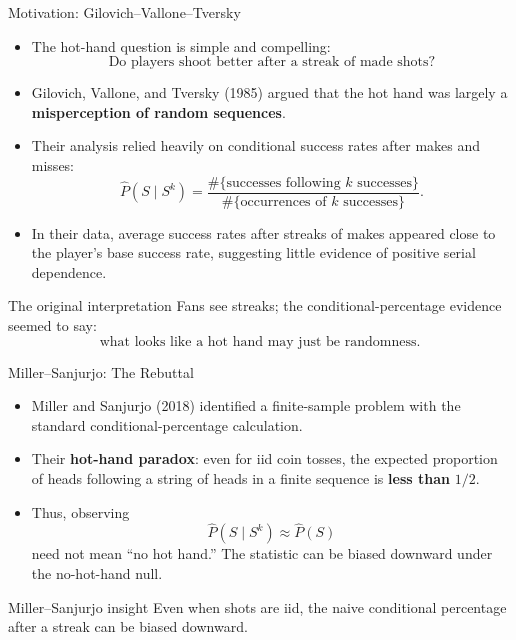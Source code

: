 \documentclass[aspectratio=169,professionalfonts]{beamer}
\begin{document}
\begin{frame}{Motivation: Gilovich--Vallone--Tversky}
\begin{itemize}
  \item The hot-hand question is simple and compelling:
  \[
    \text{Do players shoot better after a streak of made shots?}
  \]
  \item Gilovich, Vallone, and Tversky (1985) argued that the hot hand was largely a
  \textbf{misperception of random sequences}.
  \item Their analysis relied heavily on conditional success rates after makes and misses:
  \[
    \widehat P(S \mid S^k)
    =
    \frac{\#\{\text{successes following } k \text{ successes}\}}
         {\#\{\text{occurrences of } k \text{ successes}\}}.
  \]
  \item In their data, average success rates after streaks of makes appeared close to the player's
  base success rate, suggesting little evidence of positive serial dependence.
\end{itemize}

\vspace{0.2cm}
\begin{block}{The original interpretation}
Fans see streaks; the conditional-percentage evidence seemed to say:
\[
  \text{what looks like a hot hand may just be randomness.}
\]
\end{block}
\end{frame}

\begin{frame}{Miller--Sanjurjo: The Rebuttal}
\begin{itemize}
  \item Miller and Sanjurjo (2018) identified a finite-sample problem with the standard
  conditional-percentage calculation.
  \item Their \textbf{hot-hand paradox}: even for iid coin tosses,
  the expected proportion of heads following a string of heads in a finite sequence is
  \textbf{less than} \(1/2\).
  \item Thus, observing
  \[
    \widehat P(S \mid S^k) \approx \widehat P(S)
  \]
  need not mean ``no hot hand.'' The statistic can be biased downward under the no-hot-hand null.
\end{itemize}

\vspace{0.1cm}
\begin{block}{Miller--Sanjurjo insight}
Even when shots are iid, the naive conditional percentage after a streak can be biased downward.
\end{block}


\end{frame}
\end{document}
